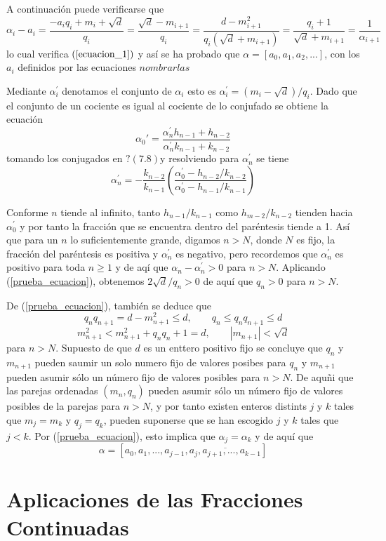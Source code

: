 \documentclass[11pt, article]{article}
\begin{document}
    A continuación puede verificarse que 
        \[
        \alpha_i-a_i=\dfrac{-a_iq_i+m_i+\sqrt{d}}{q_i}=\dfrac{\sqrt{d}-m_{i+1}}{q_i}=\dfrac{d-m_{i+1}^2}{q_i(\sqrt{d}+m_{i+1})}=\dfrac{q_i+1}{\sqrt{d}+m_{i+1}}=\dfrac{1}{\alpha_{i+1}}
        \]
    lo cual verifica $(\ref{ecuacion_1})$ y así se ha probado que $\alpha=[a_0,a_1,a_2,...]$, con los $a_i$ definidos por las ecuaciones $nombrarlas$ 
    
    Mediante $\alpha^{'}_{i}$ denotamos el conjunto de $\alpha_i$ esto es $\alpha^{'}_{i}=(m_i-\sqrt{d})/q_i$. Dado que el conjunto de un cociente es igual al cociente de lo conjufado se obtiene la ecuación
        \[
        \alpha_0{'}=\dfrac{\alpha_n^{'}h_{n-1}+h_{n-2}}{\alpha_n^{'}k_{n-1}+k_{n-2}}
        \]
    tomando los conjugados en $?(7.8)$y resolviendo para $\alpha_n^{'}$ se tiene
        \[
        \alpha_n^{'}=-\dfrac{k_{n-2}}{k_{n-1}}\left(\dfrac{\alpha_0^{'}-h_{n-2}/k_{n-2}}{\alpha_0^{'}-h_{n-1}/k_{n-1}}\right)
        \]
        
    Conforme $n$ tiende al infinito, tanto $h_{n-1}/k_{n-1}$ como $h_{m-2}/k_{n-2}$ tienden hacia $\alpha_0^{'}$ y por tanto la fracción que se encuentra dentro del paréntesis tiende a 1. Así que para un $n$ lo suficientemente grande, digamos $n>N$, 
    donde $N$ es fijo, la fracción del paréntesis es positiva y $\alpha_n^{'}$ es negativo, pero recordemos que $\alpha_n^{'}$ es positivo para toda
    $n\geq 1$ y de aqí que $\alpha_n - \alpha_n^{'}>0$ para $n>N$. Aplicando (\ref{prueba_ecuacion}), obtenemos $2 \sqrt{d}/q_{n} >0$
    de aquí que $q_n>0$ para $n>N$.
    
    De (\ref{prueba_ecuacion}), también se deduce que 
        \[
        q_nq_{n+1}=d-m^2_{n+1}\leq d, \qquad q_n\leq q_nq_{n+1}\leq d 
        \]
        \[
        m^2_{n+1} < m_{n+1}^2+q_n q_n+1=d, \qquad |m_{n+1}|<\sqrt{d}
        \]
    para $n>N$. Supuesto de que $d$ es un enttero positivo fijo se concluye que $q_n$ y $m_{n+1}$ pueden saumir un solo numero fijo de valores posibes para $q_n$ y $m_{n+1}$ pueden asumir sólo un número fijo de valores posibles para $n>N$. De aquñi que las parejas ordenadas $(m_n,q_n)$ pueden asumir sólo un número fijo de valores posibles de la parejas para $n>N$, y por tanto existen enteros distints $j$ y $k$ tales que $m_j=m_k$ y $q_j=q_k$, pueden suponerse que se han escogido $j$ y $k$ tales que $j<k$. Por (\ref{prueba_ecuacion}), esto implica que $\alpha_j=\alpha_k$ y de aquí que
        \[
        \alpha=[a_0,a_1,...,a_{j-1},\overline{a_j,a_{j+1},...,a_{k-1}}]
        \]
    
    \section*{Aplicaciones de las Fracciones Continuadas}
\end{document}

